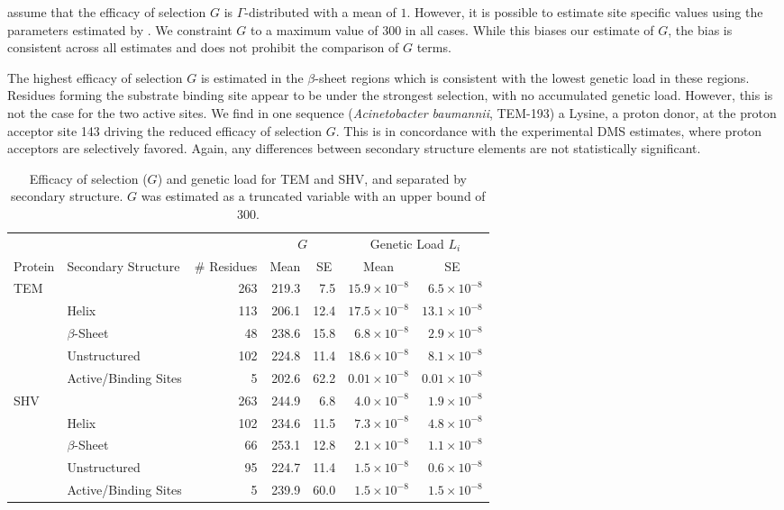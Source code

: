 \selac assume that the efficacy of selection $G$ is $\Gamma$-distributed with a mean of $1$. 
However, it is possible to estimate site specific values using the parameters estimated by \selac.
We constraint $G$ to a maximum value of $300$ in all cases.
While this biases our estimate of $G$, the bias is consistent across all estimates and does not prohibit the comparison of $G$ terms.

The highest efficacy of selection $G$ is estimated in the $\beta$-sheet regions which is consistent with the lowest genetic load in these regions.
Residues forming the substrate binding site appear to be under the strongest selection, with no accumulated genetic load.
However, this is not the case for the two active sites.
We find in one sequence (\textit{Acinetobacter baumannii}, TEM-193) a Lysine, a proton donor, at the proton acceptor site 143 driving the reduced efficacy of selection $G$. 
This is in concordance with the experimental DMS estimates, where proton acceptors are selectively favored.
Again, any differences between secondary structure elements are not statistically significant.

\begin{table}
  \centering
  \caption{Efficacy of selection ($G$) and genetic load for TEM and SHV, and separated by secondary structure. $G$ was estimated as a truncated variable with an upper bound of 300.}
  \begin{tabular}{llrrrrr}
    \hline
    & & & \multicolumn{2}{c}{$G$} & \multicolumn{2}{c}{Genetic Load $L_i$} \\ 
    Protein & Secondary Structure & \# Residues	& \multicolumn{1}{c}{Mean} & \multicolumn{1}{c}{SE} & \multicolumn{1}{c}{Mean} & \multicolumn{1}{c}{SE} \\ \hline 
    TEM	&		& 263 & 219.3 & 7.5  & $15.9\times10^{-8}$ & $6.5\times10^{-8}$ \\
    &Helix 		& 113 & 206.1 & 12.4 & $17.5\times10^{-8}$ & $13.1\times10^{-8}$ \\
    &$\beta$-Sheet 	&  48 & 238.6 & 15.8 & $ 6.8\times10^{-8}$ & $2.9\times10^{-8}$ \\
    &Unstructured 	& 102 & 224.8 & 11.4 & $18.6\times10^{-8}$ & $8.1\times10^{-8}$ \\
    &Active/Binding Sites 	&   5 & 202.6 & 62.2 & $0.01\times10^{-8}$& $0.01\times10^{-8}$ \\ \hline
    
    SHV&		& 263 & 244.9 & 6.8  & $4.0\times10^{-8}$ & $1.9\times10^{-8}$ \\
    &Helix		& 102 & 234.6 & 11.5 & $7.3\times10^{-8}$ & $4.8\times10^{-8}$ \\
    &$\beta$-Sheet 	&  66 & 253.1 & 12.8 & $2.1\times10^{-8}$ & $1.1\times10^{-8}$ \\
    &Unstructured	&  95 & 224.7 & 11.4 & $1.5\times10^{-8}$ & $0.6\times10^{-8}$  \\
    &Active/Binding Sites	&   5 & 239.9 & 60.0 & $1.5\times10^{-8}$ & $1.5\times10^{-8}$ \\ \hline
  \end{tabular}
  \label{tab:selection}
\end{table}


